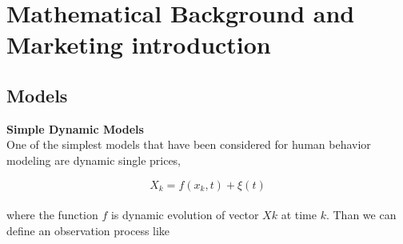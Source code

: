 \section{Mathematical Background and Marketing introduction} \label{sec:introduction}

\subsection{Models} \label{subsec:models}
\textbf{Simple Dynamic Models} \label{subsec:simpleDynamicModels}\\
One of the simplest models that have been considered for human behavior modeling are dynamic single prices,

\begin{equation} \label{eq:1}
X_k = f(x_k, t) + \xi(t)
\end{equation}
\\
where the function $f$ is dynamic evolution of vector $Xk$ at time $k$.
Than we can define an observation process like

